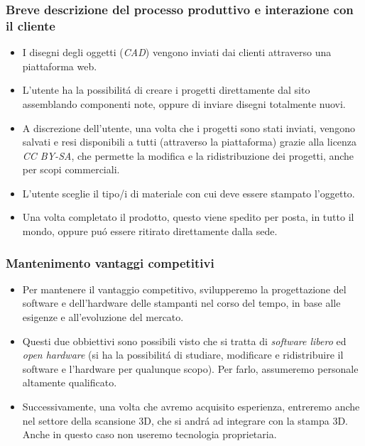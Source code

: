 \documentclass{beamer}
\begin{document}
    \begin{frame}
        \frametitle{Breve descrizione del processo produttivo e interazione con il cliente}
            \begin{itemize}
                \item I disegni degli oggetti (\emph{CAD}) vengono inviati dai
clienti attraverso una piattaforma web.
                \item L'utente ha la possibilit\'a di creare i progetti 
direttamente dal sito assemblando componenti note, oppure di inviare disegni 
totalmente nuovi.
                \item A discrezione dell'utente, una volta che i progetti sono 
stati inviati, vengono salvati e resi disponibili a tutti (attraverso la 
piattaforma) grazie alla licenza \emph{CC BY-SA}, che permette la modifica e la 
ridistribuzione dei progetti, anche per scopi commerciali.
                \item L'utente sceglie il tipo/i di materiale con cui deve 
essere stampato l'oggetto.
                \item Una volta completato il prodotto, questo viene spedito 
per posta, in tutto il mondo, oppure pu\'o essere ritirato direttamente dalla 
sede.
            \end{itemize}
    \end{frame}

    \begin{frame}
        \frametitle{Mantenimento vantaggi competitivi}
            \begin{itemize}
                \item Per mantenere il vantaggio competitivo, svilupperemo 
la progettazione del software e dell'hardware delle stampanti nel corso del 
tempo, in base alle esigenze e all'evoluzione del mercato.
                \item Questi due obbiettivi sono possibili visto che si tratta 
di \emph{software libero} ed \emph{open hardware} (si ha la 
possibilit\'a di studiare, modificare e ridistribuire il software e 
l'hardware per qualunque scopo). Per farlo, assumeremo personale altamente 
qualificato.
                \item Successivamente, una volta che avremo acquisito 
esperienza, entreremo anche nel settore della scansione 3D, che si andr\'a ad 
integrare con la stampa 3D. Anche in questo caso non useremo tecnologia 
proprietaria.
            \end{itemize}
    \end{frame}
\end{document}
